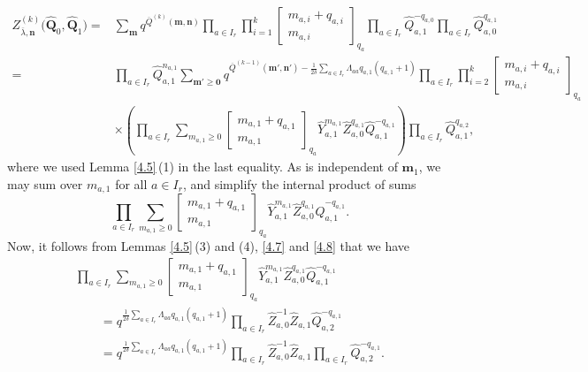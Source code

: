 \documentclass[10pt,a4paper]{amsart}
\numberwithin{equation}{section}
\begin{document}
\begin{align}
Z_{\overline{\lambda},\mathbf{n}}^{(k)}\bigl(\widehat{\mathbf{Q}}_0,\widehat{\mathbf{Q}}_1\bigr)
={}&\sum_{\mathbf{m}}q^{\overline{Q}^{(k)}(\mathbf{m},\mathbf{n})}\prod_{a\in I_r}\prod_{i=1}^k\begin{bmatrix}m_{a,i}+q_{a,i}\\m_{a,i}\end{bmatrix}_{q_a}\prod_{a\in I_r}\widehat{Q}_{a,1}^{-q_{a,0}}\prod_{a\in I_r}\widehat{Q}_{a,0}^{q_{a,1}}\nonumber\\
={}&\prod_{a\in I_r}\widehat{Q}_{a,1}^{n_{a,1}}\sum_{\mathbf{m}'\geq\mathbf{0}}q^{\overline{Q}^{(k-1)}(\mathbf{m}',\mathbf{n}')-\frac{1}{2\delta}\sum_{a\in I_r}\Lambda_{aa}q_{a,1}(q_{a,1}+1)}\prod_{a\in I_r}\prod_{i=2}^k\begin{bmatrix}m_{a,i}+q_{a,i}\\m_{a,i}\end{bmatrix}_{q_a}\nonumber\\
&\times\left(\prod_{a\in I_r}\sum_{m_{a,1}\geq0}\begin{bmatrix}m_{a,1}+q_{a,1}\\m_{a,1}\end{bmatrix}_{q_a}\widehat{Y}_{a,1}^{m_{a,1}}\widehat{Z}_{a,0}^{q_{a,1}}\widehat{Q}_{a,1}^{-q_{a,1}}\right)\prod_{a\in I_r}\widehat{Q}_{a,1}^{q_{a,2}},\label{eq:4.20}
\end{align}
where we used Lemma \ref{4.5}\,(1) in the last equality. As  is independent of $\mathbf{m}_1$, we may sum over $m_{a,1}$ for all $a\in I_r$, and simplify the internal product of sums
\begin{equation*}
\prod_{a\in I_r}\sum_{m_{a,1}\geq0}\begin{bmatrix}m_{a,1}+q_{a,1}\\m_{a,1}\end{bmatrix}_{q_a}\widehat{Y}_{a,1}^{m_{a,1}}\widehat{Z}_{a,0}^{q_{a,1}}\widehat{Q}_{a,1}^{-q_{a,1}}.
\end{equation*}
Now, it follows from Lemmas \ref{4.5}\,(3) and (4), \ref{4.7} and \ref{4.8} that we have
\begin{gather}
\prod_{a\in I_r}\sum_{m_{a,1}\geq0}\begin{bmatrix}m_{a,1}+q_{a,1}\\m_{a,1}\end{bmatrix}_{q_a}\widehat{Y}_{a,1}^{m_{a,1}}\widehat{Z}_{a,0}^{q_{a,1}}\widehat{Q}_{a,1}^{-q_{a,1}}\nonumber\\
\qquad=q^{\frac{1}{2\delta}\sum_{a\in I_r}\Lambda_{aa}q_{a,1}(q_{a,1}+1)}\prod_{a\in I_r}\widehat{Z}_{a,0}^{-1}\widehat{Z}_{a,1}\widehat{Q}_{a,2}^{-q_{a,1}}\nonumber\\
\qquad=q^{\frac{1}{2\delta}\sum_{a\in I_r}\Lambda_{aa}q_{a,1}(q_{a,1}+1)}\prod_{a\in I_r}\widehat{Z}_{a,0}^{-1}\widehat{Z}_{a,1}\prod_{a\in I_r}\widehat{Q}_{a,2}^{-q_{a,1}}.\label{eq:4.21}
\end{gather}
\end{document}
